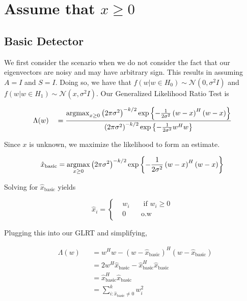 \documentclass[english]{article}
\begin{document}
\section{Assume that $x\geq0$}

\subsection{Basic Detector}
We first consider the scenario when we do not consider the fact that our eigenvectors are noisy and may have arbitrary sign. This results in assuming $A=I$ and $S=I$. Doing so, we have that $f(w|w\in H_0)\sim\mathcal{N}(0,\sigma^2I)$ and $f(w|w\in H_1)\sim\mathcal{N}(x,\sigma^2I)$. Our Generalized Likelihood Ratio Test is

\begin{equation}
\begin{aligned}
&\Lambda(w)
&&=\frac{\mathop{\rm argmax}_{x\geq0}\left(2\pi\sigma^2\right)^{-k/2}\exp\left\{-\frac{1}{2\sigma^2}\left(w-x\right)^H\left(w-x\right)\right\}}{\left(2\pi\sigma^2\right)^{-k/2}\exp\left\{-\frac{1}{2\sigma^2}w^Hw\right\}}\\
\end{aligned}
\end{equation}

Since $x$ is unknown, we maximize the likelihood to form an estimate.

\begin{equation}
\hat{x}_{\text{basic}}=\mathop{\rm argmax}_{x\geq0}\left(2\pi\sigma^2\right)^{-k/2}\exp\left\{-\frac{1}{2\sigma^2}\left(w-x\right)^H\left(w-x\right)\right\}
\end{equation}

Solving for $\hat{x}_{\text{basic}}$ yields

\begin{equation}
\hat{x}_i = \left\{
\begin{aligned}
&w_i
&&\text{ if } w_i\geq0\\
&0
&&\text{o.w}\\
\end{aligned}
\right.
\end{equation}

Plugging this into our GLRT and simplifying,

\begin{equation}
\begin{aligned}
&\Lambda(w)
&&=w^Hw-\left(w-\hat{x}_{\text{basic}}\right)^H\left(w-\hat{x}_{\text{basic}}\right)\\
&&& = 2w^H\hat{x}_{\text{basic}}-\hat{x}_{\text{basic}}^H\hat{x}_{\text{basic}}\\
&&& = \hat{x}_{\text{basic}}^H\hat{x}_{\text{basic}}\\
&&& = \sum_{i:\hat{x}_{\text{basic}}\neq0}^k w_i^2
\end{aligned}
\end{equation}
\end{document}
